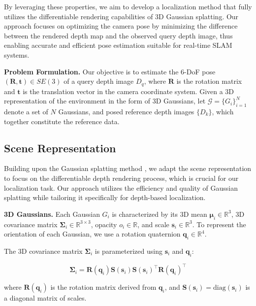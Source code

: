 \documentclass[twocolumn]{article} %
\begin{document}
By leveraging these properties, we aim to develop a localization method
that fully utilizes the differentiable rendering capabilities of 3D
Gaussian splatting. Our approach focuses on optimizing the camera pose
by minimizing the difference between the rendered depth map and the
observed query depth image, thus enabling accurate and efficient pose
estimation suitable for real-time SLAM systems.

\textbf{Problem Formulation.} Our objective is to estimate the 6-DoF
pose \((\mathbf{R}, \mathbf{t}) \in SE(3)\) of a query depth image
\(D_q\), where \(\mathbf{R}\) is the rotation matrix and \(\mathbf{t}\)
is the translation vector in the camera coordinate system. Given a 3D
representation of the environment in the form of 3D Gaussians, let
\(\mathcal{G} = \{G_i\}_{i=1}^N\) denote a set of \(N\) Gaussians, and
posed reference depth images \(\{D_k\}\), which together constitute the
reference data.

\subsection{Scene Representation}\label{scene-representation}

Building upon the Gaussian splatting method
\cite{kerbl3DGaussianSplatting2023}, we adapt the scene
representation to focus on the differentiable depth rendering process,
which is crucial for our localization task. Our approach utilizes the
efficiency and quality of Gaussian splatting while tailoring it
specifically for depth-based localization.

\textbf{3D Gaussians.} Each Gaussian \(G_i\) is characterized by its 3D
mean \(\boldsymbol{\mu}_i \in \mathbb{R}^3\), 3D covariance matrix
\(\boldsymbol{\Sigma}_i \in \mathbb{R}^{3\times3}\), opacity
\(o_i \in \mathbb{R}\), and scale \(\mathbf{s}_i \in \mathbb{R}^3\). To
represent the orientation of each Gaussian, we use a rotation quaternion
\(\mathbf{q}_i \in \mathbb{R}^4\).

The 3D covariance matrix \(\boldsymbol{\Sigma}_i\) is parameterized
using \(\mathbf{s}_i\) and \(\mathbf{q}_i\):

\[
\boldsymbol{\Sigma}_i = \mathbf{R}(\mathbf{q}_i) \mathbf{S}(\mathbf{s}_i) \mathbf{S}(\mathbf{s}_i)^\top \mathbf{R}(\mathbf{q}_i)^\top
\]

where \(\mathbf{R}(\mathbf{q}_i)\) is the rotation matrix derived from
\(\mathbf{q}_i\), and
\(\mathbf{S}(\mathbf{s}_i) = \text{diag}(\mathbf{s}_i)\) is a diagonal
matrix of scales.
\end{document}
